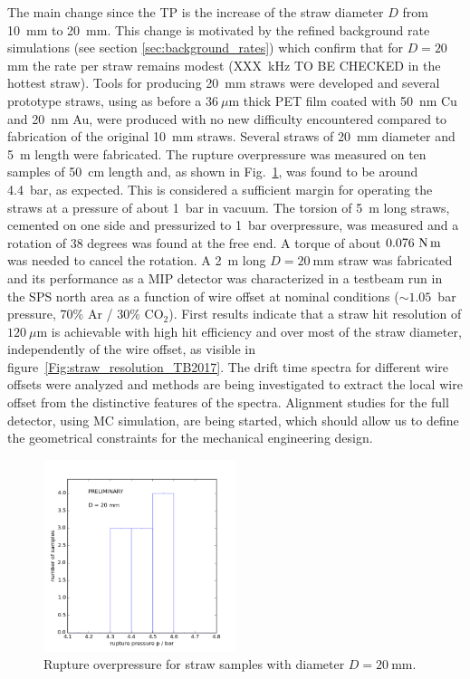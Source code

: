 The main change since the TP is the increase of the straw diameter $D$ from 10~mm to 20~mm.
This change is motivated by the refined background rate simulations (see section \ref{sec:background_rates}) 
which confirm that for $D=20~$mm the rate per straw remains modest ({\color{red}XXX~kHz TO BE CHECKED} 
in the hottest straw).
Tools for producing 20~mm straws were developed and several prototype straws,
using as before a $36~\mu$m thick PET film coated with 50~nm Cu and 20~nm Au,
were produced with no new difficulty encountered compared to fabrication of 
the original 10~mm straws. 
Several straws of 20~mm diameter and 5~m length were fabricated.
The rupture overpressure was measured on ten samples of 50~cm length and,
as shown in Fig.~\ref{fig:rupture_pressure_straws_D20mm}, was found to be around 4.4~bar, 
as expected.
This is considered a sufficient margin for operating the straws at a pressure of about 1~bar in vacuum.
The torsion of 5~m long straws, cemented on one side and pressurized to 1~bar overpressure,
was measured and a rotation of 38 degrees was found at the free end.
A torque of about $0.076~{\rm N\,m}$  was needed to cancel the rotation.
A 2~m long $D=20~$mm straw was fabricated  and its performance as a MIP detector
was characterized in a testbeam run in the SPS north area 
as a function of wire offset at nominal conditions ($\sim 1.05$~bar pressure, 
70\% Ar / 30\% CO$_2$).
First results indicate that a straw hit resolution of $120~\mu$m is achievable with high 
hit efficiency and over most of the straw diameter, independently of the wire offset,
as visible in figure~\ref{Fig:straw_resolution_TB2017}.
The drift time spectra for different wire offsets were analyzed and methods are being investigated
to extract the local wire offset from the distinctive features of the spectra.
Alignment studies for the full detector, using MC simulation, are being started, which should allow
us to define the geometrical constraints for the mechanical engineering design.

\begin{figure}[htb]
\begin{center}
\includegraphics[width=0.5\textwidth]{figs/DecaySpectrometer/rupture_pressure_straws_D20mm.png}
\caption{Rupture overpressure for straw samples with diameter $D=20~$mm.}
\label{fig:rupture_pressure_straws_D20mm}
\end{center}
\end{figure}

